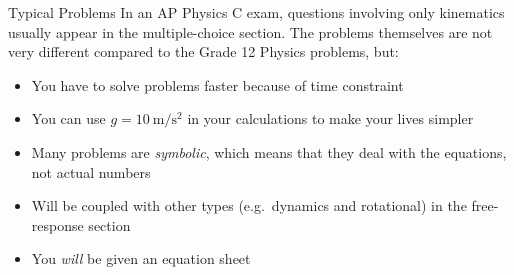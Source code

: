 \documentclass[12pt,compress,aspectratio=169]{beamer}
\begin{document}
\begin{frame}{Typical Problems}
  In an AP Physics C exam, questions involving only kinematics usually appear
  in the multiple-choice section. The problems themselves are not very different
  compared to the Grade 12 Physics problems, but:
  \begin{itemize}
  \item You have to solve problems faster because of time constraint
  \item You can use $g=\SI{10}{\metre/\second\squared}$
    in your calculations to make your lives simpler
  \item Many problems are \emph{symbolic}, which means that they deal with
    the equations, not actual numbers
  \item Will be coupled with other types (e.g.\ dynamics and rotational) in
    the free-response section
  \item You \emph{will} be given an equation sheet
  \end{itemize}
\end{frame}
\end{document}
